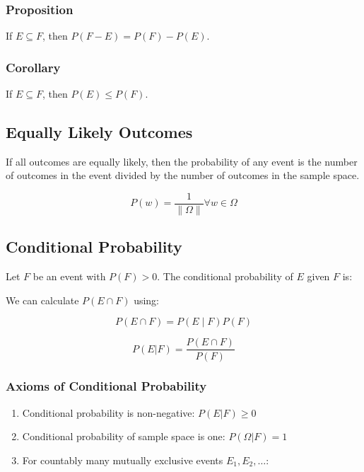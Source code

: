       \subsubsection*{Proposition}

      If $E \subseteq F$, then $P(F-E) = P(F) - P(E)$.

      \subsubsection*{Corollary}

      If $E \subseteq F$, then $P(E) \leq P(F)$.

      \subsection*{Equally Likely Outcomes}

      If all outcomes are equally likely, then the probability of any event is the number of outcomes in the event divided by the number of outcomes in the sample space.

$$ P(w) = \frac{1}{\|\Omega\|} \forall w \in \Omega $$

      \subsection*{Conditional Probability}

      Let $F$ be an event with $P(F) > 0$. The conditional probability of $E$ given $F$ is:

      We can calculate $P(E \cap F)$ using:

$$ P(E \cap F) = P(E \mid F)P(F) $$

$$ P(E|F) = \frac{P(E \cap F)}{P(F)} $$

      \subsubsection*{Axioms of Conditional Probability}

      \begin{enumerate}
            \item Conditional probability is non-negative: $P(E|F) \geq 0$
            \item Conditional probability of sample space is one: $P(\Omega|F) = 1$
            \item For countably many mutually exclusive events $E_1, E_2, \dots$:
      \end{enumerate}

